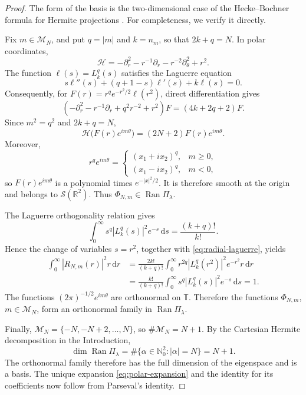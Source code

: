 \documentclass[10pt,a4paper]{amsart}
\numberwithin{equation}{section}
\newcommand{\R}{\mathbb R}
\newcommand{\T}{\mathbb T}
\newcommand{\dd}{\,\mathrm d}
\begin{document}
\begin{proof}
The form of the basis is the two-dimensional case of the Hecke--Bochner
formula for Hermite projections \cite[Theorem~3.4.1]{Thangavelu}. For
completeness, we verify it directly.

Fix \(m\in\mathcal M_N\), and put \(q=|m|\) and \(k=n_m\), so that
\(2k+q=N\). In polar coordinates,
\[
 \mathcal H=-\partial_r^2-r^{-1}\partial_r-r^{-2}\partial_\theta^2+r^2.
\]
The function \(\ell(s)=L_k^q(s)\) satisfies the Laguerre equation
\[
 s\ell''(s)+(q+1-s)\ell'(s)+k\ell(s)=0.
\]
Consequently, for \(F(r)=r^qe^{-r^2/2}\ell(r^2)\), direct differentiation
gives
\[
 \left(-\partial_r^2-r^{-1}\partial_r+q^2r^{-2}+r^2\right)F
 =(4k+2q+2)F.
\]
Since \(m^2=q^2\) and \(2k+q=N\),
\[
 \mathcal H\bigl(F(r)e^{im\theta}\bigr)
 =(2N+2)F(r)e^{im\theta}.
\]
Moreover,
\[
 r^qe^{im\theta}=
 \begin{cases}
  (x_1+ix_2)^q,&m\ge0,\\
  (x_1-ix_2)^q,&m<0,
 \end{cases}
\]
so \(F(r)e^{im\theta}\) is a polynomial times \(e^{-|x|^2/2}\). It is
therefore smooth at the origin and belongs to \(\mathcal S(\R^2)\). Thus
\(\Phi_{N,m}\in\operatorname{Ran}\Pi_\lambda\).

The Laguerre orthogonality relation
\cite[(5.1.1)]{Szego} gives
\[
 \int_0^\infty s^q|L_k^q(s)|^2e^{-s}\dd s=\frac{(k+q)!}{k!}.
\]
Hence the change of variables \(s=r^2\), together with
\eqref{eq:radial-laguerre}, yields
\begin{align*}
 \int_0^\infty|R_{N,m}(r)|^2r\dd r
 &=\frac{2k!}{(k+q)!}
   \int_0^\infty r^{2q}|L_k^q(r^2)|^2e^{-r^2}r\dd r\\
 &=\frac{k!}{(k+q)!}
   \int_0^\infty s^q|L_k^q(s)|^2e^{-s}\dd s
 =1.
\end{align*}
The functions \((2\pi)^{-1/2}e^{im\theta}\) are orthonormal on \(\T\).
Therefore the functions \(\Phi_{N,m}\), \(m\in\mathcal M_N\), form an
orthonormal family in \(\operatorname{Ran}\Pi_\lambda\).

Finally, \(\mathcal M_N=\{-N,-N+2,\ldots,N\}\), so
\(\#\mathcal M_N=N+1\). By the Cartesian Hermite decomposition in the
Introduction,
\[
 \dim\operatorname{Ran}\Pi_\lambda
 =\#\{\alpha\in\mathbb N_0^2:|\alpha|=N\}=N+1.
\]
The orthonormal family therefore has the full dimension of the eigenspace and
is a basis. The unique expansion \eqref{eq:polar-expansion} and the identity
for its coefficients now follow from Parseval's identity.
\end{proof}
\end{document}
